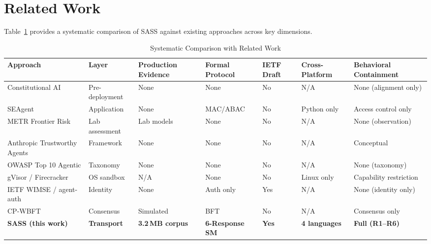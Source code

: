 \documentclass[sigconf,anonymous]{acmart}
\begin{document}
\section{Related Work}

Table~\ref{tab:related} provides a systematic comparison of SASS against existing approaches across key dimensions.

\begin{table}[t]
\caption{Systematic Comparison with Related Work}
\label{tab:related}
\small
\begin{tabular}{@{}p{3.2cm}p{1.8cm}p{1.5cm}p{1.8cm}p{1.5cm}p{1.5cm}p{1.8cm}@{}}
\toprule
\textbf{Approach} & \textbf{Layer} & \textbf{Production Evidence} & \textbf{Formal Protocol} & \textbf{IETF Draft} & \textbf{Cross-Platform} & \textbf{Behavioral Containment} \\
\midrule
Constitutional AI~\cite{bai2022constitutional} & Pre-deployment & None & None & No & N/A & None (alignment only) \\
SEAgent~\cite{seagent2026} & Application & None & MAC/ABAC & No & Python only & Access control only \\
METR Frontier Risk & Lab assessment & Lab models & None & No & N/A & None (observation) \\
Anthropic Trustworthy Agents & Framework & None & None & No & N/A & Conceptual \\
OWASP Top 10 Agentic & Taxonomy & None & None & No & N/A & None (taxonomy) \\
gVisor / Firecracker & OS sandbox & N/A & None & No & Linux only & Capability restriction \\
IETF WIMSE / agent-auth & Identity & None & Auth only & Yes & N/A & None (identity only) \\
CP-WBFT~\cite{cpwbft2025} & Consensus & Simulated & BFT & No & N/A & Consensus only \\
\textbf{SASS (this work)} & \textbf{Transport} & \textbf{3.2\,MB corpus} & \textbf{6-Response SM} & \textbf{Yes} & \textbf{4 languages} & \textbf{Full (R1--R6)} \\
\bottomrule
\end{tabular}
\end{table}
\end{document}
